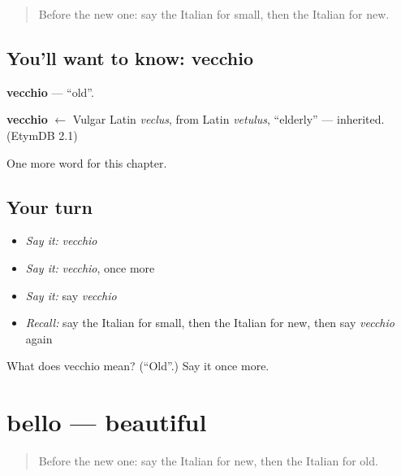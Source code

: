 \label{lesson:IT-C72-vecchio}



\begin{quote}
Before the new one: say the Italian for small, then the Italian for new.
\end{quote}

\subsection*{You'll want to know: vecchio}
\textbf{vecchio} — \textquotedblleft{}old\textquotedblright{}.

\begin{cousinweb}
\textbf{vecchio} $\leftarrow$ Vulgar Latin \emph{veclus}, from Latin \emph{vetulus}, \textquotedblleft{}elderly\textquotedblright{} — inherited. (EtymDB 2.1)
\end{cousinweb}

\begin{grammarlens}[title={What you've built}]
One more word for this chapter.
\end{grammarlens}

\subsection*{Your turn}
\begin{itemize}
\raggedright
  \item \emph{Say it:} \emph{vecchio}
  \item \emph{Say it:} \emph{vecchio}, once more
  \item \emph{Say it:} say \emph{vecchio}
  \item \emph{Recall:} say the Italian for small, then the Italian for new, then say \emph{vecchio} again
\end{itemize}

\begin{tcolorbox}[breakable,colback=teal!4,colframe=teal!35!black,title={Before you move on}]
What does vecchio mean? (\textquotedblleft{}Old\textquotedblright{}.) Say it once more.
\end{tcolorbox}
\section[bello]{bello — beautiful}

\label{lesson:IT-C72-bello}



\begin{quote}
Before the new one: say the Italian for new, then the Italian for old.
\end{quote}

